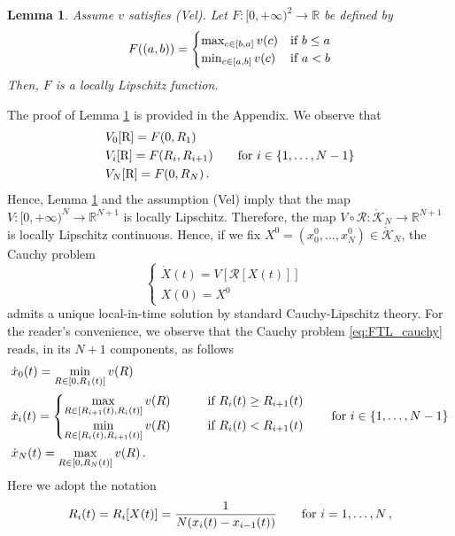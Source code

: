\documentclass[reqno,oneside]{amsart}
\theoremstyle{plain}
\newtheorem{lemma}{Lemma}[section]
\newcommand{\R}{\mathbb{R}}
\begin{document}
\begin{lemma}\label{lem:max_min}
    Assume $v$ satisfies (Vel). Let $F:[0,+\infty)^2\rightarrow \R$ be defined by 
    \[F((a,b))=\begin{cases}
        \max_{c\in [b,a]}v(c) & \hbox{if $b\leq a$}\\
        \min_{c\in [a,b]}v(c) & \hbox{if $a<b$}
    \end{cases}\]
    Then, $F$ is a locally Lipschitz function.
\end{lemma}
The proof of Lemma \ref{lem:max_min} is provided in the Appendix. We observe that
\begin{align*}
    & V_0[\mathrm{R}]=F(0,R_1)\\
    & V_i[\mathrm{R}]=F(R_i,R_{i+1})\qquad \hbox{for $i\in\{1,\ldots,N-1\}$}\\
    & V_N[\mathrm{R}]=F(0,R_N)\,.
\end{align*}
Hence, Lemma \ref{lem:max_min} and the assumption (Vel) imply that the map $V:[0,+\infty)^N\rightarrow \R^{N+1}$ is locally Lipschitz. Therefore, the map $V\circ \mathcal{R}:\mathring{\mathcal{K}}_N\rightarrow \R^{N+1}$ is locally Lipschitz continuous. Hence, if we fix $X^0=(x_0^0,\ldots,x_N^0)\in \mathring{\mathcal{K}}_N$, the Cauchy problem
\begin{equation}\label{eq:FTL_cauchy}
\begin{cases}
     \dot{X}(t)=V[\mathcal{R}[X(t)]] & \\
 X(0)=X^0
\end{cases}
\end{equation}
admits a unique local-in-time solution by standard Cauchy-Lipschitz theory. For the reader's convenience, we observe that the Cauchy problem \eqref{eq:FTL_cauchy} reads, in its $N+1$ components, as follows
\begin{align}
    & \dot{x}_0(t)=\min_{R\in[0,R_1(t)]}v(R) \nonumber\\
    & \dot{x}_i(t)=
    \begin{cases}
\displaystyle{\max_{R\in[R_{i+1}(t),R_i(t)]}v(R)} & \qquad\hbox{if $R_i(t)\geq R_{i+1}(t)$}\\
        \displaystyle{\min_{R\in [R_i(t),R_{i+1}(t)]}v(R)} &\qquad \hbox{if $R_i(t)<R_{i+1}(t)$}
    \end{cases} \qquad \hbox{for $i\in \{1,\ldots,N-1\}$}\label{eq:FTL_components}\\
   & \dot{x}_N(t)=\max_{R\in [0,R_N(t)]}v(R)\,.\nonumber
\end{align}
Here we adopt the notation
\begin{equation}\label{eq:short_R}
R_i(t)=R_i[X(t)]=\frac{1}{N(x_i(t)-x_{i-1}(t))}\qquad \hbox{for $i=1,\ldots,N$}\,,
\end{equation}
\end{document}
